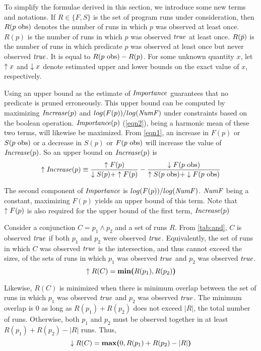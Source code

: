 To simplify the formulae derived in this section, we introduce some new terms and
notations.  If $R \in \{F, S\}$ is the set of program runs under consideration, then
$R(\text{$p$ obs})$ denotes the number of runs in which $p$ was observed at least
once.  $R(p)$ is the number of runs in which $p$ was observed $\mathit{true}$ at least once.
$R(\text{$\bar{p}$})$ is the number of runs in which predicate $p$ was observed
at least once but never observed $\mathit{true}$.  It is equal to $R(\text{$p$ obs}) - R(p)$.
For some unknown quantity $x$, let $\uparrow x$ and $\downarrow x$ denote estimated upper
and lower bounds on the exact value of $x$, respectively.

Using an upper bound as the estimate of $\mathit{Importance}$ guarantees that no
predicate is pruned erroneously.  This upper bound can be computed by maximizing
$\mathit{Increase}(p)$ and $log(F(p))/log(\mathit{NumF})$ under constraints based on the boolean operation.
$\mathit{Importance}(p)$ (\autoref{eqn2}), being a harmonic mean of these two terms, will
likewise be maximized.  From \autoref{eqn1}, an increase in $F(p)$ or $S(\text{$p$ obs})$
or a decrease in $S(p)$ or $F(\text{$p$ obs})$ will increase the value of $\mathit{Increase}(p)$.
So an upper bound on $\mathit{Increase}(p)$ is
%
\begin{equation}
\label{eqn3}
\uparrow\mathit{Increase}(p) \equiv
\frac{\uparrow F(p)}{\downarrow S(p) + \uparrow F(p)}
-
\frac{\downarrow F(\text{$p$ obs})}{\uparrow S(\text{$p$ obs}) + \downarrow F(\text{$p$ obs})}
\end{equation}

The second component of $\mathit{Importance}$ is $log(F(p))/log(\mathit{NumF})$.  $\mathit{NumF}$
being a constant, maximizing $F(p)$ yields an upper bound of this term.  Note that
$\uparrow F(p)$ is also required for the upper bound of the first term, $\mathit{Increase}(p)$

Consider a conjunction $C = p_1 \wedge p_2$ and a set of runs $R$.  From \autoref{tab:and}, $C$ is
observed $\mathit{true}$ if both $p_1$ and $p_2$ were observed $\mathit{true}$.  Equivalently, the set
of runs in which $C$ was observed $\mathit{true}$ is the intersection,
and thus cannot exceed the sizes, of the sets of
runs in which $p_1$ was observed $\mathit{true}$ and $p_2$ was observed $\mathit{true}$.
\begin{equation*}
  \uparrow R(C) = \textbf{min(}R(p_1), R(p_2)\textbf{)}
\end{equation*}

Likewise, $R(C)$ is minimized when there is minimum overlap between the set
of runs in which $p_1$ was observed $\mathit{true}$ and $p_2$ was observed $\mathit{true}$.
The minimum overlap is $0$ as long as $R(p_1) + R(p_2)$ does not exceed $|R|$,
the total number of runs.  Otherwise, both $p_1$ and $p_2$ must be observed
together in at least $R(p_1) + R(p_2) - |R|$ runs.  Thus,
\begin{equation*}
  \downarrow R(C) = \textbf{max(}0, R(p_1) + R(p_2) - |R|\textbf{)}
\end{equation*}

